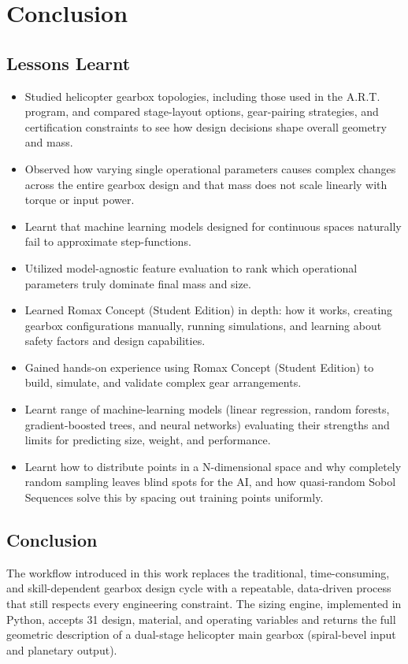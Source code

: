 \chapter{Conclusion}
\section{Lessons Learnt}
	\begin{itemize}
		\item Studied helicopter gearbox topologies, including those used in the A.R.T. program, and 
		compared stage-layout options, gear-pairing strategies, and certification constraints to see how 
		design decisions shape overall geometry and mass.
		\item Observed how varying single operational parameters causes complex changes across the entire gearbox design 
		and that mass does not scale linearly with torque or input power.
		\item Learnt that machine learning models designed for continuous spaces naturally fail to approximate step-functions.
		\item Utilized model-agnostic feature evaluation to rank which operational parameters truly dominate final mass and size.
		\item Learned Romax Concept (Student Edition) in depth: how it works, creating gearbox configurations manually, 
		running simulations, and learning about safety factors and design capabilities.
		\item Gained hands-on experience using Romax Concept (Student Edition) to build, simulate, and validate 
		complex gear arrangements.
		\item Learnt range of machine-learning models (linear regression, random forests, gradient-boosted trees, 
		and neural networks) evaluating their strengths and limits for predicting size, weight, and performance.
		\item Learnt how to distribute points in a N-dimensional space and why completely random sampling leaves blind spots 
		for the AI, and how quasi-random Sobol Sequences solve this by spacing out training points uniformly.
	\end{itemize}

\section{Conclusion}
	The workflow introduced in this work replaces the traditional, time-consuming, and skill-dependent gearbox design cycle 
	with a repeatable, data-driven process that still respects every engineering constraint. The sizing engine, implemented 
	in Python, accepts 31 design, material, and operating variables and returns the full geometric description of a 
	dual-stage helicopter main gearbox (spiral-bevel input and planetary output).  

